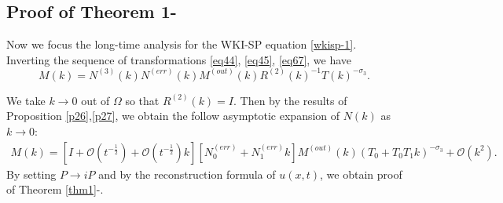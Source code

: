 \documentclass[11pt]{article}
\numberwithin{equation}{section}
\begin{document}
\subsection{Proof of Theorem 1-\uppercase\expandafter{}}
Now we focus the long-time analysis for the WKI-SP equation \eqref{wkisp-1}. Inverting  the sequence  of transformations \eqref{eq44}, \eqref{eq45}, \eqref{eq67}, we have
\begin{equation}
    M(k)=N^{(3)}(k)N^{(err)}(k)M^{(out)}(k)R^{(2)}(k)^{-1}T(k)^{-\sigma_3}.
\end{equation}

We take $k\to 0$ out of $\Omega$ so that $R^{(2)}(k)=I$. Then by the results of Proposition \ref{p26},\ref{p27}, we obtain the follow asymptotic expansion of ${N}(k)$ as $k\to0$:
\begin{align*}
    M(k)=\left[I+\mathcal{O}(t^{-\frac{1}{2}})+\mathcal{O}(t^{-\frac{1}{2}})k\right]\left[N^{(err)}_0+N^{(err)}_1k\right]M^{(out)}(k)\left(T_0+T_0T_1k\right)^{-\sigma_3}+\mathcal{O}(k^2).
\end{align*}
By setting $P\to { i} P$ and by the reconstruction formula of $u(x,t)$, we obtain proof of Theorem \ref{thm1}-\uppercase\expandafter{}.
\end{document}
